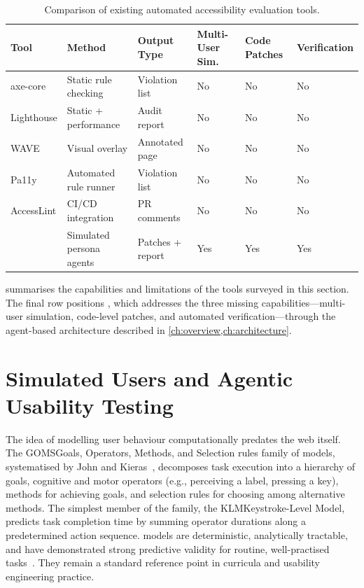 \begin{table}[htbp]
  \centering
  \caption{Comparison of existing automated accessibility evaluation tools.}
  \label{tab:tool-comparison}
  \begin{tabularx}{\textwidth}{@{}l L{2.5cm} L{2.5cm} C{1.8cm} C{1.8cm} C{1.8cm}@{}}
    \toprule
    \textbf{Tool} & \textbf{Method} & \textbf{Output Type} & \textbf{Multi-User Sim.} & \textbf{Code Patches} & \textbf{Verification} \\
    \midrule
    axe-core        & Static rule checking      & Violation list       & No  & No  & No  \\
    Lighthouse      & Static + performance      & Audit report         & No  & No  & No  \\
    WAVE            & Visual overlay            & Annotated page       & No  & No  & No  \\
    Pa11y           & Automated rule runner     & Violation list       & No  & No  & No  \\
    AccessLint      & CI/CD integration         & PR comments          & No  & No  & No  \\
    \midrule
    \versimux{}     & Simulated persona agents  & Patches + report     & Yes & Yes & Yes \\
    \bottomrule
  \end{tabularx}
\end{table}

 summarises the capabilities and limitations of the tools surveyed in this section. The final row positions \versimux{}, which addresses the three missing capabilities---multi-user simulation, code-level patches, and automated verification---through the agent-based architecture described in \cref{ch:overview,ch:architecture}.


\section{Simulated Users and Agentic Usability Testing}
\label{sec:bg-simulated-users}

The idea of modelling user behaviour computationally predates the web itself. The \acrfull{GOMS}{Goals, Operators, Methods, and Selection rules} family of models, systematised by John and Kieras~\cite{john1996goms}, decomposes task execution into a hierarchy of goals, cognitive and motor operators (e.g., perceiving a label, pressing a key), methods for achieving goals, and selection rules for choosing among alternative methods. The simplest member of the family, the \acrfull{KLM}{Keystroke-Level Model}, predicts task completion time by summing operator durations along a predetermined action sequence.  models are deterministic, analytically tractable, and have demonstrated strong predictive validity for routine, well-practised tasks~\cite{john1996goms}. They remain a standard reference point in  curricula and usability engineering practice.

